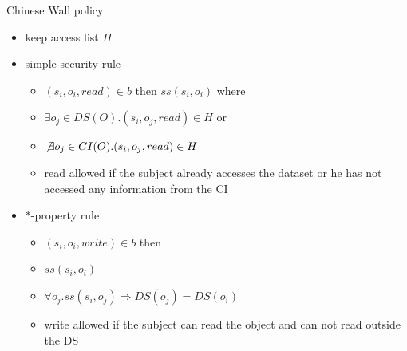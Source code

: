 \documentclass{beamer}
\begin{document}
\begin{frame}{Chinese Wall policy}
  \begin{itemize}
    \item keep access list $H$
    \item simple security rule
      \begin{itemize}
        \item $(s_i, o_i, read) \in b$ then $ss(s_i,o_i)$ where
        \item $\exists o_j \in DS(O). (s_i, o_j, read) \in H$ or
        \item $\not \exists o_j \in CI(O). (s_i, o_j, read) \in H$
        \item read allowed if the subject already accesses the dataset
          or he has not accessed any information from the CI
      \end{itemize}
    \item $*$-property rule
      \begin{itemize}
        \item $(s_i, o_i, write) \in b$ then
        \item $ss(s_i,o_i)$
        \item $\forall o_j.ss(s_i,o_j) \Rightarrow DS(o_j) = DS(o_i)$
        \item write allowed if the subject can read the object and can
          not read outside the DS
      \end{itemize}
  \end{itemize}
\end{frame}
\end{document}
